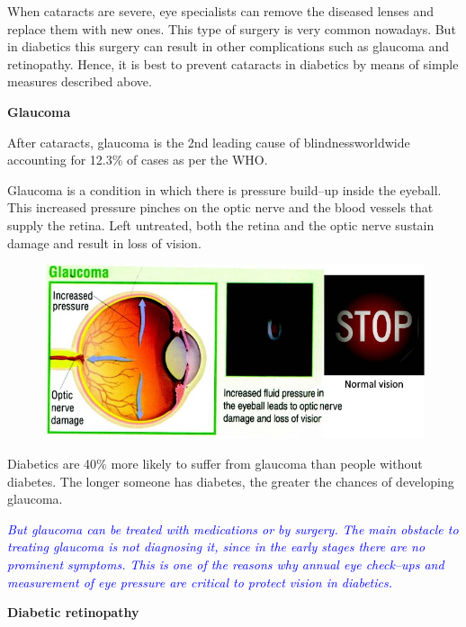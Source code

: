 When cataracts are severe, eye specialists can remove the diseased lenses and replace them with new ones. This type of surgery is very common nowadays. But in diabetics this surgery can result in other complications such as glaucoma and retinopathy. Hence, it is best to prevent cataracts in diabetics by means of simple measures described above.

\clearpage
\noindent\textbf{Glaucoma}

After cataracts, glaucoma is the 2nd leading cause of blindness\break worldwide accounting for 12.3\% of cases as per the WHO.

Glaucoma is a condition in which there is pressure build–up inside the eyeball. This increased pressure pinches on the optic nerve and the blood vessels that supply the retina. Left untreated, both the retina and the optic nerve sustain damage and result in loss of vision.

\begin{figure}[h]
\centering
\includegraphics[scale=2.2]{images/051.jpg}
\end{figure}

Diabetics are 40\% more likely to suffer from glaucoma than people without diabetes. The longer someone has diabetes, the greater the chances of developing glaucoma.

\textcolor{blue}{\textit{But glaucoma can be treated with medications or by surgery. The main obstacle to treating glaucoma is not diagnosing it, since in the early stages there are no prominent symptoms. This is one of the reasons why annual eye check–ups and measurement of eye pressure are critical to protect vision in diabetics.}}

\noindent\textbf{Diabetic retinopathy}

